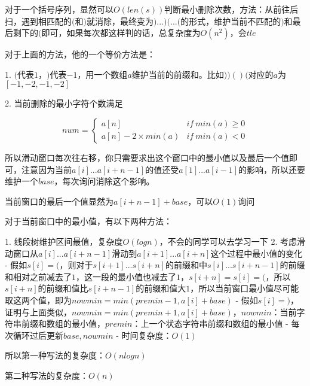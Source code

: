 对于一个括号序列，显然可以$O(len(s))$判断最小删除次数，方法：从前往后扫，遇到相匹配的$($和$)$就消除，最终变为$)...)(...($的形式，维护当前不匹配的$)$和最后剩下的$($即可，如果每次都这样判的话，总复杂度为$O(n^2)$，会$tle$

对于上面的方法，他的一个等价方法是：

1. $($代表$1$，$)$代表$-1$，用一个数组$a$维护当前的前缀和。比如$))()($对应的$a$为$[-1, -2, -1, -2]$

2. 当前删除的最小字符个数满足

   $$num= \begin{cases} a[n]& {if \ min(a) \geq 0}\\ a[n] - 2 \times min(a)& {if \ min(a) < 0} \end{cases}$$

所以滑动窗口每次往右移，你只需要求出这个窗口中的最小值以及最后一个值即可，注意因为当前$a[i]...a[i + n - 1]$的值还受$a[1]...a[i - 1]$的影响，所以还要维护一个$base$，每次询问消除这个影响。

当前窗口的最后一个值显然为$a[i + n - 1] + base$，可以$O(1)$询问

对于当前窗口中的最小值，有以下两种方法：

1. 线段树维护区间最值，复杂度$O(logn)$，不会的同学可以去学习一下
2. 考虑滑动窗口从$a[i]...a[i + n - 1]$滑动到$a[i + 1]...a[i + n]$这个过程中最小值的变化
   - 假如$s[i] = ($，则对于$s[i + 1]...s[i + n]$的前缀和中$s[i]...s[i + n - 1]$的前缀和相对之前减去了$1$，这一段的最小值也减去了$1$，$s[i + n] = s[i] = ($，所以$s[i + n]$的前缀和值比$s[i + n - 1]$的前缀和值大$1$，所以当前窗口最小值尽可能取这两个值，即为$nowmin = min(premin - 1, a[i] + base)$
   - 假如$s[i] = )$，证明与上面类似，$nowmin = min(premin + 1, a[i] + base)$，$nowmin$：当前字符串前缀和数组的最小值，$premin$：上一个状态字符串前缀和数组的最小值
   - 每次循环过后更新$base,nowmin$
   - 时间复杂度：$O(1)$

所以第一种写法的复杂度：$O(nlogn)$

第二种写法的复杂度：$O(n)$
